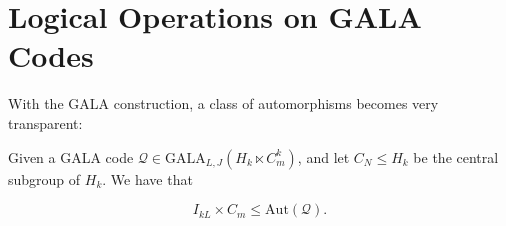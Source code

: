 \section{Logical Operations on GALA Codes}\label{sec:logic}

With the GALA construction, a class of automorphisms becomes very transparent: 

\begin{proposition}
    Given a GALA code $\mathcal{Q} \in \mathrm{GALA}_{L,J}(H_k\ltimes C^k_m)$, and let $C_N\leq  H_k$ be the central subgroup of $H_k$. We have that

    \begin{equation}
        I_{kL}\times C_m \leq \mathrm{Aut}(\mathcal{Q}).
    \end{equation}
\end{proposition}

